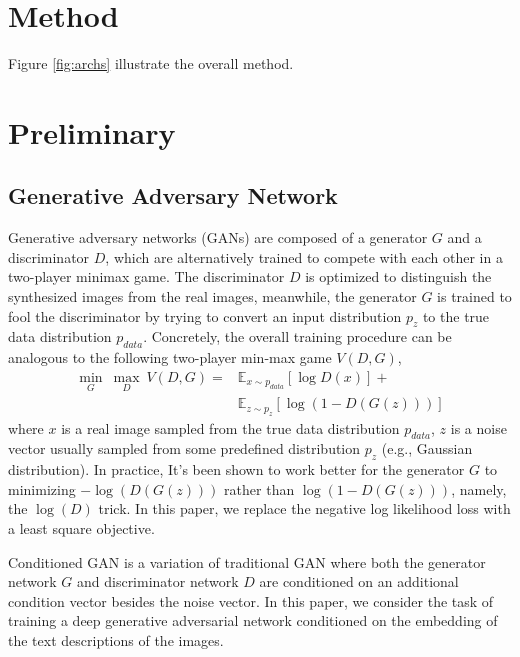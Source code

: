 \documentclass[10pt,twocolumn,letterpaper]{article}
\begin{document}
%
%
%
\begin{figure}[t]
	\centering
	\caption{} \label{fig:archs-compare}
\end{figure}

\section{Method}
Figure \ref{fig:archs} illustrate the overall method.


\section{Preliminary}
\subsection{Generative Adversary Network}
Generative adversary networks (GANs) are composed of a generator $G$ and a discriminator $D$, which are alternatively trained to compete with each other in a two-player minimax game. The discriminator $D$ is optimized to distinguish the synthesized images from the real images, meanwhile, the generator $G$ is trained to fool the discriminator by trying to convert an input distribution $p_z$ to the true data distribution $p_{data}$. Concretely, the overall training procedure can be analogous to the following two-player min-max game $V(D, G)$,
\begin{equation}
\label{game}
\begin{split}
\underset{G}{\min}\ \underset{D}{\max}\ V(D, G) =  &\mathbb{E}_{x\sim p_{data}}[\log D(x)] +  \\
&\mathbb{E}_{z\sim p_{z}}[\log (1-D(G(z)))]		   
\end{split}
\end{equation}
where $x$ is a real image sampled from the true data distribution $p_{data}$, $z$ is a noise vector usually sampled from some predefined distribution $p_{z}$ (e.g., Gaussian distribution).
In practice, It's been shown to work better for the generator $G$ to minimizing $-\log(D(G(z)))$ rather than $\log(1-D(G(z)))$, namely, the $\log(D)$ trick.
In this paper, we replace the negative log likelihood loss with a least square objective\cite{lsgan}. 

Conditioned GAN \cite{isola2016image} is a variation of traditional GAN where both the generator network $G$ and discriminator network $D$ are conditioned on an additional condition vector besides the noise vector. In this paper, we consider the task of training a deep  generative adversarial network conditioned on the embedding of the text descriptions of the images.
\end{document}
